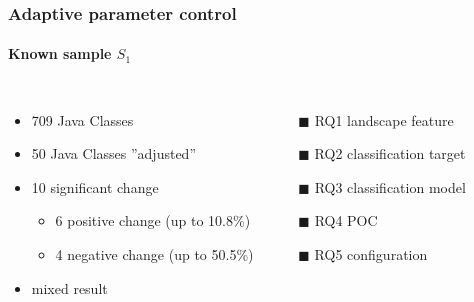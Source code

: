 \begin{frame}
	\frametitle{Adaptive parameter control}
	\framesubtitle{Known sample $S_1$}
	
	\begin{columns}[c]
	
		\begin{itemize}
			\item 709 Java Classes
			\item 50 Java Classes ''adjusted''
			\item 10 significant change
			\begin{itemize}
				\item 6 positive change (up to 10.8\%)
				\item 4 negative change (up to 50.5\%)
			\end{itemize}
			\item mixed result
		\end{itemize}
		
		\begin{itemize}
			\item[\textcolor{hni-gray}{$\blacksquare$}] \textcolor{hni-gray}{RQ1 landscape feature \checkmark}
			\item[$\blacksquare$] RQ2 classification target \xmark
			\item[\textcolor{hni-gray}{$\blacksquare$}] \textcolor{hni-gray}{RQ3 classification model \checkmark}
			\item[\textcolor{hni-gray}{$\blacksquare$}] \textcolor{hni-gray}{RQ4 POC \checkmark}
			\item[$\blacksquare$] RQ5 configuration \xmark
		\end{itemize}	
	
	\end{columns}
	
\end{frame}

